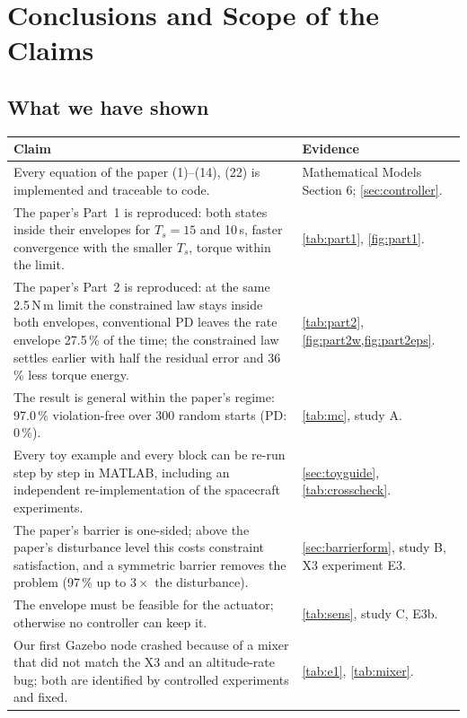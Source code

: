 \section{Conclusions and Scope of the Claims}
\label{sec:claims}

\subsection{What we have shown}

\begin{center}\small
\begin{longtable}{@{}p{7.3cm} p{6.9cm}@{}}
\toprule
\textbf{Claim} & \textbf{Evidence}\\
\midrule\endhead
Every equation of the paper (1)--(14), (22) is implemented and traceable to code. & Mathematical Models Section 6; \cref{sec:controller}.\\
The paper's Part~1 is reproduced: both states inside their envelopes for $T_s=15$ and 10\,s, faster convergence with the smaller $T_s$, torque within the limit. & \cref{tab:part1}, \cref{fig:part1}.\\
The paper's Part~2 is reproduced: at the same 2.5\,N\,m limit the constrained law stays inside both envelopes, conventional PD leaves the rate envelope 27.5\,\% of the time; the constrained law settles earlier with half the residual error and 36\,\% less torque energy. & \cref{tab:part2}, \cref{fig:part2w,fig:part2eps}.\\
The result is general within the paper's regime: 97.0\,\% violation-free over 300 random starts (PD: 0\,\%). & \cref{tab:mc}, study A.\\
Every toy example and every block can be re-run step by step in MATLAB, including an independent re-implementation of the spacecraft experiments. & \cref{sec:toyguide}, \cref{tab:crosscheck}.\\
The paper's barrier is one-sided; above the paper's disturbance level this costs constraint satisfaction, and a symmetric barrier removes the problem (97\,\% up to $3\times$ the disturbance). & \cref{sec:barrierform}, study B, X3 experiment E3.\\
The envelope must be feasible for the actuator; otherwise no controller can keep it. & \cref{tab:sens}, study C, E3b.\\
Our first Gazebo node crashed because of a mixer that did not match the X3 and an altitude-rate bug; both are identified by controlled experiments and fixed. & \cref{tab:e1}, \cref{tab:mixer}.\\

\end{longtable}
\end{center}
